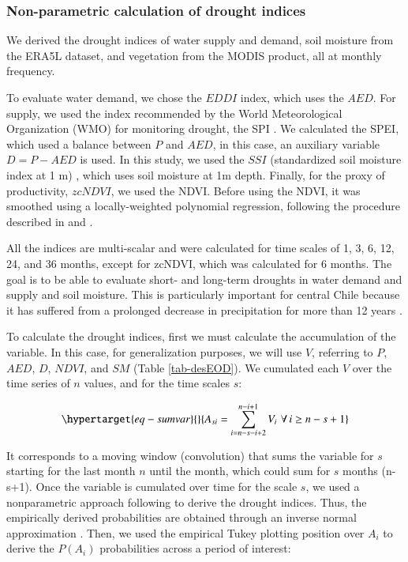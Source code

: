 \documentclass[
  number,
  preprint,
  3p,
  onecolumn]{elsarticle}
\begin{document}
\hypertarget{non-parametric-calculation-of-drought-indices}{%
\subsubsection{Non-parametric calculation of drought
indices}\label{non-parametric-calculation-of-drought-indices}}

We derived the drought indices of water supply and demand, soil moisture
from the ERA5L dataset, and vegetation from the MODIS product, all at
monthly frequency.

To evaluate water demand, we chose the \(EDDI\)
\citep{Hobbins2016, McEvoy2016} index, which uses the \(AED\). For
supply, we used the index recommended by the World Meteorological
Organization (WMO) for monitoring drought, the SPI \citep{Mckee1993}. We
calculated the SPEI, which used a balance between \(P\) and \(AED\), in
this case, an auxiliary variable \(D = P-AED\) is used. In this study,
we used the \(SSI\) (standardized soil moisture index at 1 m)
\citep{Hao2013, AghaKouchak2014}, which uses soil moisture at 1m depth.
Finally, for the proxy of productivity, \(zcNDVI\), we used the NDVI.
Before using the NDVI, it was smoothed using a locally-weighted
polynomial regression, following the procedure described in
\citep{Zambrano2018} and \citep{Zambrano2016}.

All the indices are multi-scalar and were calculated for time scales of
1, 3, 6, 12, 24, and 36 months, except for zcNDVI, which was calculated
for 6 months. The goal is to be able to evaluate short- and long-term
droughts in water demand and supply and soil moisture. This is
particularly important for central Chile because it has suffered from a
prolonged decrease in precipitation for more than 12 years
\citep{Garreaud2020, Boisier2018, Garreaud2017}.

To calculate the drought indices, first we must calculate the
accumulation of the variable. In this case, for generalization purposes,
we will use \(V\), referring to \(P\), \(AED\), \(D\), \(NDVI\), and
\(SM\) (Table \ref{tab-desEOD}). We cumulated each \(V\) over the time
series of \(n\) values, and for the time scales \(s\):

\begin{equation}\protect\hypertarget{eq-sumvar}{}{A_{si} = \sum_{i=n-s-i+2}^{n-i+1} V_i\,\, \forall\, i\geq n-s+1  }\label{eq-sumvar}\end{equation}

It corresponds to a moving window (convolution) that sums the variable
for \(s\) starting for the last month \(n\) until the month, which could
sum for \(s\) months (n-s+1). Once the variable is cumulated over time
for the scale \(s\), we used a nonparametric approach following
\citep{Hobbins2016} to derive the drought indices. Thus, the empirically
derived probabilities are obtained through an inverse normal
approximation \citep{Abramowitz1968}. Then, we used the empirical Tukey
plotting position \citep{Wilks2011} over \(A_i\) to derive the
\(P(A_i)\) probabilities across a period of interest:
\end{document}
